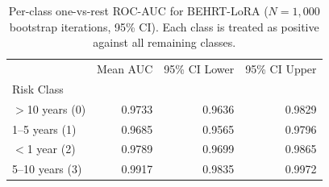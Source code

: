 \documentclass{article}
\begin{document}
\begin{table}
\caption{Per-class one-vs-rest ROC-AUC for BEHRT-LoRA ($N=1{,}000$ bootstrap iterations, 95\% CI). Each class is treated as positive against all remaining classes.}
\label{tab:roc_auc_per_class}
\begin{tabular}{lrrr}
\toprule
 & Mean AUC & 95\% CI Lower & 95\% CI Upper \\
Risk Class &  &  &  \\
\midrule
$>$10 years (0) & 0.9733 & 0.9636 & 0.9829 \\
1–5 years (1) & 0.9685 & 0.9565 & 0.9796 \\
$<$1 year (2) & 0.9789 & 0.9699 & 0.9865 \\
5–10 years (3) & 0.9917 & 0.9835 & 0.9972 \\
\bottomrule
\end{tabular}
\end{table}
\end{document}
